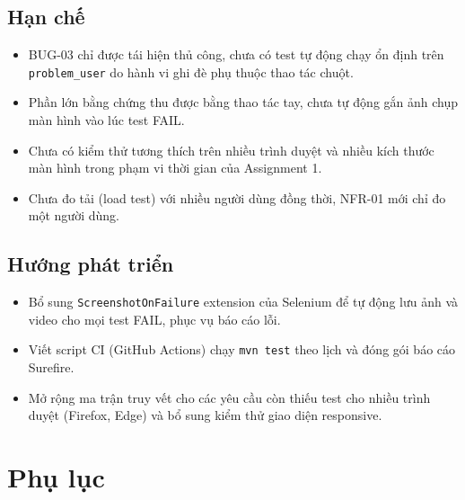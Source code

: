 \documentclass[12pt,a4paper]{article}
\begin{document}
\subsection{Hạn chế}
\begin{itemize}[label=\textcolor{failred}{}]
    \item BUG-03 chỉ được tái hiện thủ công, chưa có test tự động chạy ổn định trên \texttt{problem\_user} do hành vi ghi đè phụ thuộc thao tác chuột.
    \item Phần lớn bằng chứng thu được bằng thao tác tay, chưa tự động gắn ảnh chụp màn hình vào lúc test FAIL.
    \item Chưa có kiểm thử tương thích trên nhiều trình duyệt và nhiều kích thước màn hình trong phạm vi thời gian của Assignment 1.
    \item Chưa đo tải (load test) với nhiều người dùng đồng thời, NFR-01 mới chỉ đo một người dùng.
\end{itemize}

\subsection{Hướng phát triển}
\begin{itemize}
    \item Bổ sung \texttt{ScreenshotOnFailure} extension của Selenium để tự động lưu ảnh và video cho mọi test FAIL, phục vụ báo cáo lỗi.
    \item Viết script CI (GitHub Actions) chạy \texttt{mvn test} theo lịch và đóng gói báo cáo Surefire.
    \item Mở rộng ma trận truy vết cho các yêu cầu còn thiếu test cho nhiều trình duyệt (Firefox, Edge) và bổ sung kiểm thử giao diện responsive.
\end{itemize}

\newpage
\section*{Phụ lục}
\end{document}
